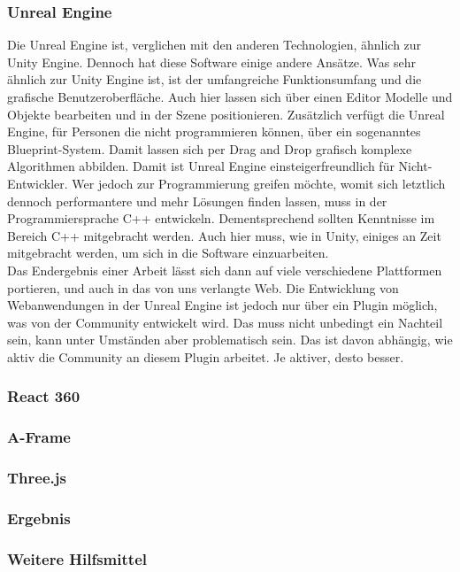 \documentclass[a4paper,12pt,oneside]{article}
\begin{document}
      \subsubsection{Unreal Engine}
        Die Unreal Engine ist, verglichen mit den anderen Technologien, ähnlich zur 
        Unity Engine. Dennoch hat diese Software einige andere Ansätze. Was sehr ähnlich
        zur Unity Engine ist, ist der umfangreiche Funktionsumfang und die grafische 
        Benutzeroberfläche. Auch hier lassen sich über einen Editor Modelle und Objekte
        bearbeiten und in der Szene positionieren. Zusätzlich verfügt die Unreal Engine,
        für Personen die nicht programmieren können, über ein sogenanntes Blueprint-System.
        Damit lassen sich per Drag and Drop grafisch komplexe Algorithmen abbilden. Damit
        ist Unreal Engine einsteigerfreundlich für Nicht-Entwickler.
        Wer jedoch zur Programmierung greifen möchte, womit sich letztlich dennoch
        performantere und mehr Lösungen finden lassen, muss in der Programmiersprache
        C++ entwickeln. Dementsprechend sollten Kenntnisse im Bereich C++ 
        mitgebracht werden. Auch hier muss, wie in Unity, einiges an Zeit mitgebracht
        werden, um sich in die Software einzuarbeiten.\\
        Das Endergebnis einer Arbeit lässt sich dann auf viele verschiedene Plattformen
        portieren, und auch in das von uns verlangte Web. Die Entwicklung von Webanwendungen
        in der Unreal Engine ist jedoch nur über ein Plugin möglich, was von der Community
        entwickelt wird. Das muss nicht unbedingt ein Nachteil sein, kann unter Umständen
        aber problematisch sein. Das ist davon abhängig, wie aktiv die Community an diesem
        Plugin arbeitet. Je aktiver, desto besser.
      \subsubsection{React 360}
      \subsubsection{A-Frame}
      \subsubsection{Three.js}
      \subsubsection{Ergebnis}
      \subsubsection{Weitere Hilfsmittel}
\end{document}
